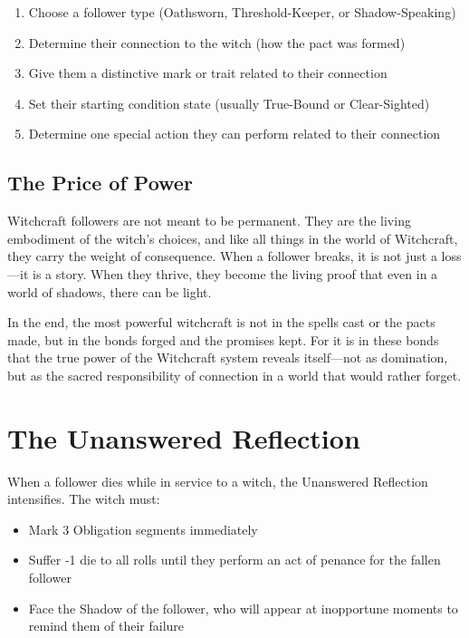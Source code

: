 \begin{enumerate}
    \item Choose a follower type (Oathsworn, Threshold-Keeper, or Shadow-Speaking)
    \item Determine their connection to the witch (how the pact was formed)
    \item Give them a distinctive mark or trait related to their connection
    \item Set their starting condition state (usually True-Bound or Clear-Sighted)
    \item Determine one special action they can perform related to their connection
\end{enumerate}

\subsection{The Price of Power}

Witchcraft followers are not meant to be permanent. They are the living embodiment of the witch's choices, and like all things in the world of Witchcraft, they carry the weight of consequence. When a follower breaks, it is not just a loss---it is a story. When they thrive, they become the living proof that even in a world of shadows, there can be light.

In the end, the most powerful witchcraft is not in the spells cast or the pacts made, but in the bonds forged and the promises kept. For it is in these bonds that the true power of the Witchcraft system reveals itself---not as domination, but as the sacred responsibility of connection in a world that would rather forget.

\section*{The Unanswered Reflection}

When a follower dies while in service to a witch, the Unanswered Reflection intensifies. The witch must:

\begin{itemize}
    \item Mark 3 Obligation segments immediately
    \item Suffer -1 die to all rolls until they perform an act of penance for the fallen follower
    \item Face the Shadow of the follower, who will appear at inopportune moments to remind them of their failure
\end{itemize}

